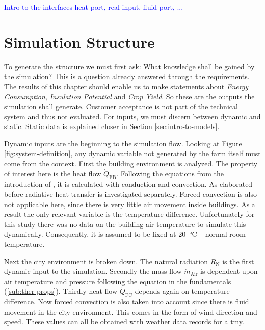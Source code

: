 \textcolor{Blue}{Intro to the interfaces heat port, real input, fluid port, ...}

\section{Simulation Structure}
To generate the structure we must first ask: What knowledge shall be gained by the simulation?
This is a question already answered through the  requirements.
The results of this chapter should enable us to make statements about \textit{Energy Consumption}, \textit{Insulation Potential} and \textit{Crop Yield}.
So these are the outputs the simulation shall generate.
Customer acceptance is not part of the technical system and thus not evaluated.
For inputs, we must discern between dynamic and static.
Static data is explained closer in Section \ref{sec:intro-to-models}.

Dynamic inputs are the beginning to the simulation flow.
Looking at Figure \ref{fig:system-definition}, any dynamic variable not generated by the farm itself must come from the context.
First the building environment is analyzed.
The property of interest here is the heat flow $\dot{Q}_{\text{FB}}$.
Following the equations from the introduction of , it is calculated with conduction and convection.
As elaborated before radiative heat transfer is investigated separately.
Forced convection is also not applicable here, since there is very little air movement inside buildings.
As a result the only relevant variable is the temperature difference.
Unfortunately for this study there was no data on the building air temperature to simulate this dynamically.
Consequently, it is assumed to be fixed at \SI{20}{\degreeCelsius} -- normal room temperature.

Next the city environment is broken down.
The natural radiation $R_\text{N}$ is the first dynamic input to the simulation.
Secondly the mass flow $\dot{m}_{\text{Air}}$ is dependent upon air temperature and pressure following the equation in the fundamentals (\ref{sub:ther-props}).
Thirdly heat flow $\dot{Q}_{\text{FC}}$ depends again on temperature difference.
Now forced convection is also taken into account since there is fluid movement in the city environment.
This comes in the form of wind direction and speed.
These values can all be obtained with weather data records for a \ac{tmy}.

